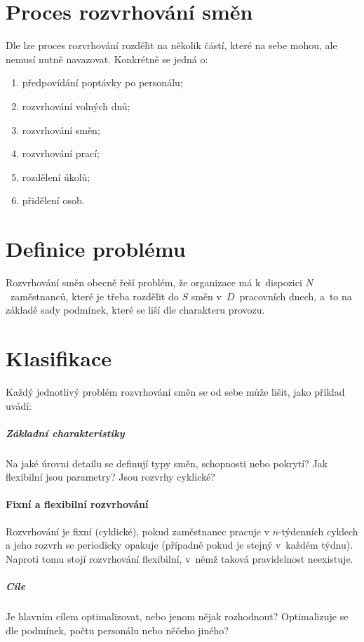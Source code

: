 \documentclass[twoside]{ctuthesis}
\begin{document}
\section{Proces rozvrhování směn}
Dle \cite{ernst2004staff} lze proces rozvrhování rozdělit na několik částí, které na sebe mohou, ale nemusí nutně navazovat. Konkrétně se jedná o:
\begin{enumerate}
	\item předpovídání poptávky po personálu;
	\item rozvrhování volných dnů;
	\item rozvrhování směn;
	\item rozvrhování prací;
	\item rozdělení úkolů;
	\item přidělení osob.
\end{enumerate}

\section{Definice problému}

Rozvrhování směn obecně řeší problém, že organizace má k~dispozici $N$~zaměstnanců, které je třeba rozdělit do $S$ směn v~$D$~pracovních dnech, a~to na základě sady podmínek, které se liší dle charakteru provozu.

\section{Klasifikace}
\label{sec:clasif}

Každý jednotlivý problém rozvrhování směn se od sebe může lišit, \cite{de2011categorisation} jako příklad uvádí:

\subparagraph{Základní charakteristiky}
Na jaké úrovni detailu se definují typy směn, schopnosti nebo pokrytí? Jak flexibilní jsou parametry? Jsou rozvrhy cyklické?

\paragraph{Fixní a flexibilní rozvrhování}
Rozvrhování je fixní (cyklické), pokud zaměstnanec pracuje v $n$-týdenních cyklech a jeho rozvrh se periodicky opakuje (případně pokud je stejný v~každém týdnu). Naproti tomu stojí rozvrhování flexibilní, v~němž taková pravidelnost neexistuje. \cite{burke2004state}

\subparagraph{Cíle}
Je hlavním cílem optimalizovat, nebo jenom nějak rozhodnout? Optimalizuje se dle podmínek, počtu personálu nebo něčeho jiného?
\end{document}
